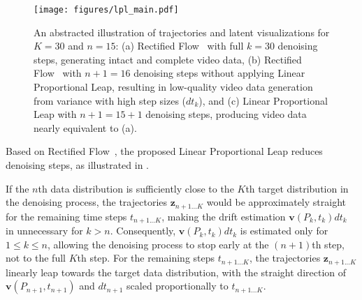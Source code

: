 \begin{figure}[!t]
    \centering
    \texttt{[image: figures/lpl\_main.pdf]}
    \caption{An abstracted illustration of trajectories and latent visualizations for $K=30$ and $n=15$: (a) Rectified Flow~\cite{liu2022flow} with full $k=30$ denoising steps, generating intact and complete video data, (b) Rectified Flow~\cite{liu2022flow} with $n+1=16$ denoising steps without applying Linear Proportional Leap, resulting in low-quality video data generation from variance with high step sizes ($dt_{k}$), and (c) Linear Proportional Leap with $n+1=15+1$ denoising steps, producing video data nearly equivalent to (a).}
    \label{fig:lpl-mainfig}
\end{figure}

Based on Rectified Flow~\cite{liu2022flow}, the proposed Linear Proportional Leap reduces denoising steps, as illustrated in . 

If the $n$th data distribution is sufficiently close to the $K$th target distribution in the denoising process, the trajectories $\boldsymbol{z}_{n+1 ... K}$ would be approximately straight for the remaining time steps $t_{n+1 ... K}$, making the drift estimation $\boldsymbol{v}(P_k,t_k)dt_k$  in  unnecessary for $k {>} n$. Consequently, $\boldsymbol{v}(P_k,t_k)dt_k$ is estimated only for $1 {\leq} k {\leq} n$, allowing the denoising process to stop early at the $(n+1)$th step, not to the full $K$th step. For the remaining steps $t_{n+1 ... K}$, the trajectories $\boldsymbol{z}_{n+1 ... K}$ linearly leap towards the target data distribution, with the straight direction of $\boldsymbol{v}(P_{n+1},t_{n+1})$ and $dt_{n+1}$ scaled proportionally to $t_{n+1 ... K}$.

